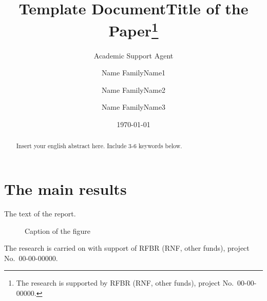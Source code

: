 \documentclass{article}
\title{Template Document}
\author{Academic Support Agent}
\date{\today}
\begin{document}
\maketitle

%
\title{Title of the Paper\thanks{The research is supported by RFBR (RNF, other funds), project No.~00-00-00000.}}
\author{Name FamilyName1
  \and
  Name FamilyName2
  \and
  Name FamilyName3
}

\maketitle

\begin{abstract}
Insert your english abstract here. Include 3-6 keywords below.

\end{abstract}

\section{The main results}


The text of the report.

\begin{figure}[htb]
  \centering

%
  \begin{center}
     \end{center}
  \caption{Caption of the figure}\label{fig:example}
\end{figure}

The research is carried on with support of RFBR (RNF, other funds), project No.~00-00-00000.
\end{document}
